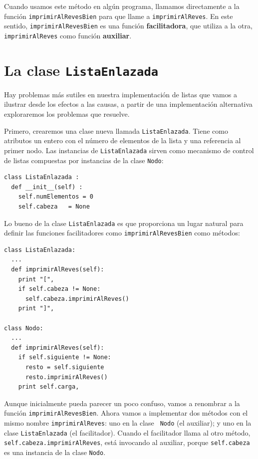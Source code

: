 
Cuando usamos este método en algún programa, llamamos directamente a la función
 \texttt{imprimirAlRevesBien}  para que llame a \texttt{imprimirAlReves}.  
En este sentido, \texttt{imprimirAlRevesBien} es una función {\bf facilitadora}, 
que utiliza a la otra, \texttt{imprimirAlReves} como función {\bf auxiliar}.


\section {La clase \texttt{ListaEnlazada}}

Hay problemas más sutiles en nuestra implementación de listas que vamos 
a ilustrar desde los efectos a las causas, a partir de una implementación
alternativa exploraremos los problemas que resuelve.

Primero, crearemos una clase nueva llamada \texttt{ListaEnlazada}. Tiene
como atributos un entero con el número de elementos de la lista y una 
referencia al primer nodo. Las instancias de  \texttt{ListaEnlazada} sirven
como mecanismo de control de listas compuestas por instancias de la clase
 \texttt{Nodo}:

\beforeverb
\begin{verbatim}
class ListaEnlazada :
  def __init__(self) :
    self.numElementos = 0
    self.cabeza   = None
\end{verbatim}
\afterverb
%
Lo bueno de la clase \texttt{ListaEnlazada} es que proporciona un lugar
natural para definir las funciones facilitadores como 
\texttt{imprimirAlRevesBien} como métodos:

\beforeverb
\begin{verbatim}
class ListaEnlazada:
  ...
  def imprimirAlReves(self):
    print "[",
    if self.cabeza != None:
      self.cabeza.imprimirAlReves()
    print "]",

class Nodo:
  ...
  def imprimirAlReves(self):
    if self.siguiente != None:
      resto = self.siguiente
      resto.imprimirAlReves()
    print self.carga,
\end{verbatim}
\afterverb
%
Aunque inicialmente pueda parecer un poco confuso, vamos a renombrar a la función
 \texttt{imprimirAlRevesBien}.
Ahora vamos a implementar dos métodos con el mismo nombre \texttt{imprimirAlReves}: uno en la clase {\tt
Nodo}  (el auxiliar); y uno en la clase \texttt{ListaEnlazada} (el facilitador).
Cuando el facilitador llama al otro método, \texttt{self.cabeza.imprimirAlReves},
está invocando al auxiliar, porque \texttt{self.cabeza} es una instancia de
la clase \texttt{Nodo}.

